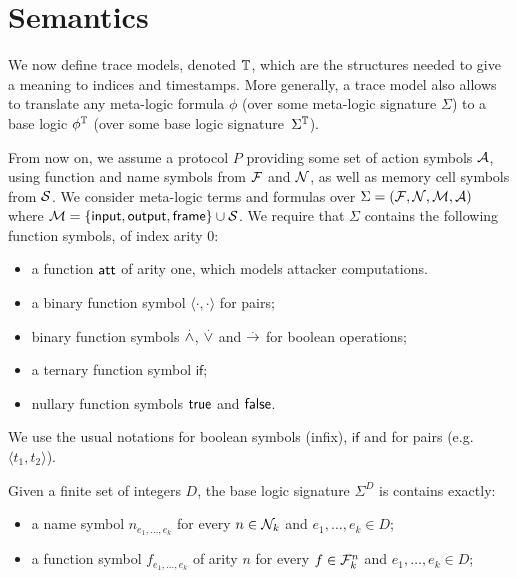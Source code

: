 \section{Semantics}

We now define trace models, denoted $\mathbb{T}$, which are the structures needed to
give a meaning to indices and timestamps. More generally, a trace model
also allows to translate any meta-logic formula $\phi$
(over some meta-logic signature $\Sigma$)
to a base logic $\phi^{\mathbb{T}}$ (over some base logic signature~$\Sigma^{\mathbb{T}}$).

\medskip

From now on, we assume a protocol $P$ providing some set of action
symbols $\mathcal{A}$, using function and name symbols from $\mathcal{F}$ and $\mathcal{N}$,
as well as memory cell symbols from $\mathcal{S}$.
We consider meta-logic terms and formulas over $\Sigma = (\mathcal{F},\mathcal{N},\mathcal{M},\mathcal{A})$
where $\mathcal{M} = \{ \textsf{input}, \textsf{output}, \textsf{frame} \} \cup \mathcal{S}$. We require that $\Sigma$ contains the following function symbols, of index arity $0$:
\begin{itemize}
\item a function $\mathsf{att}$ of arity one, which models attacker computations.
\item a binary function symbol $\langle \cdot , \cdot \rangle$ for pairs;
\item binary function symbols
  $\stackrel{.}{\wedge}$, $\stackrel{.}{\vee}$ and
  $\stackrel{.}{\rightarrow}$ for boolean operations;
\item a ternary function symbol $\mathsf{if}$;
\item nullary function symbols $\textsf{true}$ and $\textsf{false}$.
\end{itemize}
We use the usual notations for boolean symbols (infix), $\mathsf{if}$ and for pairs (e.g.\ $\langle t_1,t_2 \rangle$).

\begin{definition}
  Given a finite set of integers $D$, the base logic
  signature $\Sigma^D$ is contains exactly:
  \begin{itemize}
    \item a name symbol $n_{e_1,\ldots,e_k}$ for every $n \in \mathcal{N}_k$
       and $e_1,\ldots,e_k \in D$;
    \item a function symbol $f_{e_1,\ldots,e_k}$ of arity $n$ for every
      $f \in \mathcal{F}_k^n$ and $e_1,\ldots,e_k \in D$;
  \end{itemize}
\end{definition}

